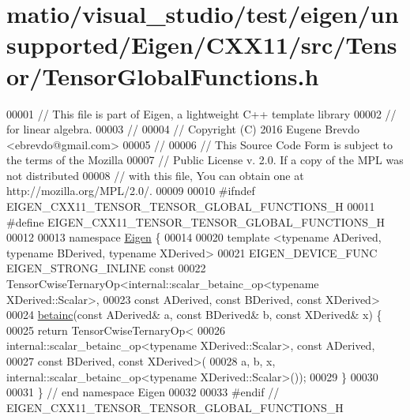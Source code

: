\hypertarget{matio_2visual__studio_2test_2eigen_2unsupported_2_eigen_2_c_x_x11_2src_2_tensor_2_tensor_global_functions_8h_source}{}\section{matio/visual\+\_\+studio/test/eigen/unsupported/\+Eigen/\+C\+X\+X11/src/\+Tensor/\+Tensor\+Global\+Functions.h}
\label{matio_2visual__studio_2test_2eigen_2unsupported_2_eigen_2_c_x_x11_2src_2_tensor_2_tensor_global_functions_8h_source}

\begin{DoxyCode}
00001 \textcolor{comment}{// This file is part of Eigen, a lightweight C++ template library}
00002 \textcolor{comment}{// for linear algebra.}
00003 \textcolor{comment}{//}
00004 \textcolor{comment}{// Copyright (C) 2016 Eugene Brevdo <ebrevdo@gmail.com>}
00005 \textcolor{comment}{//}
00006 \textcolor{comment}{// This Source Code Form is subject to the terms of the Mozilla}
00007 \textcolor{comment}{// Public License v. 2.0. If a copy of the MPL was not distributed}
00008 \textcolor{comment}{// with this file, You can obtain one at http://mozilla.org/MPL/2.0/.}
00009 
00010 \textcolor{preprocessor}{#ifndef EIGEN\_CXX11\_TENSOR\_TENSOR\_GLOBAL\_FUNCTIONS\_H}
00011 \textcolor{preprocessor}{#define EIGEN\_CXX11\_TENSOR\_TENSOR\_GLOBAL\_FUNCTIONS\_H}
00012 
00013 \textcolor{keyword}{namespace }\hyperlink{namespace_eigen}{Eigen} \{
00014 
00020 \textcolor{keyword}{template} <\textcolor{keyword}{typename} ADerived, \textcolor{keyword}{typename} BDerived, \textcolor{keyword}{typename} XDerived>
00021 EIGEN\_DEVICE\_FUNC EIGEN\_STRONG\_INLINE \textcolor{keyword}{const}
00022     TensorCwiseTernaryOp<internal::scalar\_betainc\_op<typename XDerived::Scalar>,
00023                          \textcolor{keyword}{const} ADerived, \textcolor{keyword}{const} BDerived, \textcolor{keyword}{const} XDerived>
00024     \hyperlink{namespace_eigen_a726eae91d4e91d8e25cbe55fffa6a92f}{betainc}(\textcolor{keyword}{const} ADerived& a, \textcolor{keyword}{const} BDerived& b, \textcolor{keyword}{const} XDerived& x) \{
00025   \textcolor{keywordflow}{return} TensorCwiseTernaryOp<
00026       internal::scalar\_betainc\_op<typename XDerived::Scalar>, \textcolor{keyword}{const} ADerived,
00027       \textcolor{keyword}{const} BDerived, \textcolor{keyword}{const} XDerived>(
00028       a, b, x, internal::scalar\_betainc\_op<typename XDerived::Scalar>());
00029 \}
00030 
00031 \} \textcolor{comment}{// end namespace Eigen}
00032 
00033 \textcolor{preprocessor}{#endif // EIGEN\_CXX11\_TENSOR\_TENSOR\_GLOBAL\_FUNCTIONS\_H}
\end{DoxyCode}
